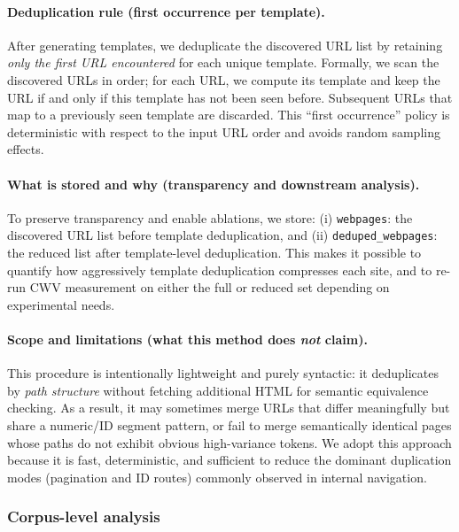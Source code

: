 \paragraph{Deduplication rule (first occurrence per template).}
After generating templates, we deduplicate the discovered URL list by retaining \emph{only the first URL encountered} for each unique template. Formally, we scan the discovered URLs in order; for each URL, we compute its template and keep the URL if and only if this template has not been seen before. Subsequent URLs that map to a previously seen template are discarded. This ``first occurrence'' policy is deterministic with respect to the input URL order and avoids random sampling effects.

\paragraph{What is stored and why (transparency and downstream analysis).}
To preserve transparency and enable ablations, we store:
(i) \texttt{webpages}: the discovered URL list before template deduplication, and
(ii) \texttt{deduped\_webpages}: the reduced list after template-level deduplication.
This makes it possible to quantify how aggressively template deduplication compresses each site, and to re-run CWV measurement on either the full or reduced set depending on experimental needs.

\paragraph{Scope and limitations (what this method does \emph{not} claim).}
This procedure is intentionally lightweight and purely syntactic: it deduplicates by \emph{path structure} without fetching additional HTML for semantic equivalence checking. As a result, it may sometimes merge URLs that differ meaningfully but share a numeric/ID segment pattern, or fail to merge semantically identical pages whose paths do not exhibit obvious high-variance tokens. We adopt this approach because it is fast, deterministic, and sufficient to reduce the dominant duplication modes (pagination and ID routes) commonly observed in internal navigation.

\subsubsection{Corpus-level analysis}
\label{app:page-expansion-analysis}


